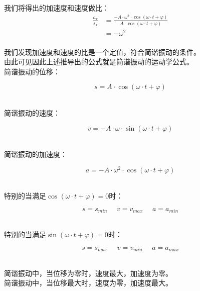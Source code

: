 \documentclass[UTF8]{ctexart}
\begin{document}
\newpage

    我们将得出的加速度和速度做比：\vspace{5pt}
    \begin{align}
        \frac{a_x}{s_x}
        &=\frac{-A\cdot\omega^2\cdot\cos{(\omega\cdot t+\varphi)}}{A\cdot \cos{\left(\omega\cdot t+\varphi\right)}}\\[2mm]
        &=-\omega^2
    \end{align}\\
    我们发现加速度和速度的比是一个定值，符合简谐振动的条件。\\[3mm]
    由此可见因此上述推导出的公式就是简谐振动的运动学公式。\\[5mm]
    简谐振动的位移：
    \begin{large}
        \begin{equation*}
            s=A\cdot \cos{\left(\omega\cdot t+\varphi\right)}
        \end{equation*}
    \end{large}\\
    简谐振动的速度：
    \begin{large}
        \begin{equation*}
            v=-A\cdot\omega\cdot\sin{(\omega\cdot t+\varphi)}
        \end{equation*}
    \end{large}\\
    简谐振动的加速度：
    \begin{large}
        \begin{equation*}
            a=-A\cdot\omega^2\cdot\cos{(\omega\cdot t+\varphi)}
        \end{equation*}
    \end{large}\\[2mm]
    特别的当满足$\cos{(\omega\cdot t+\varphi)}=0$时：
    \begin{large}
        \begin{equation*}
            s=s_{min}~~~~~~v=v_{max}~~~~~~a=a_{min}
        \end{equation*}
    \end{large}\\
    特别的当满足$\sin{(\omega\cdot t+\varphi)}=0$时：
    \begin{large}
        \begin{equation*}
            s=s_{max}~~~~~~v=v_{min}~~~~~~a=a_{max}
        \end{equation*}
    \end{large}\\
    简谐振动中，当位移为零时，速度最大，加速度为零。\\[3mm]
    简谐振动中，当位移最大时，速度为零，加速度最大。\\[3mm]
\end{document}
